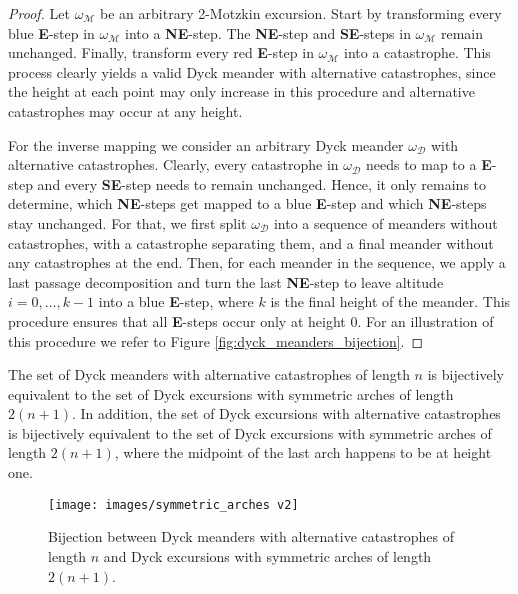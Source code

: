 \begin{proof}
  Let $\omega_\mathcal{M}$ be an arbitrary 2-Motzkin excursion. 
  Start by transforming every blue {\color{lightblue} \textbf{E}}-step in $\omega_\mathcal{M}$ into a \textbf{NE}-step. 
  The \textbf{NE}-step and \textbf{SE}-steps in $\omega_\mathcal{M}$ remain unchanged.
  Finally, transform every red {\color{catred}\textbf{E}}-step in $\omega_\mathcal{M}$ into a catastrophe.
  This process clearly yields a valid Dyck meander with alternative catastrophes, since the height at each point may only increase in this procedure and alternative catastrophes may occur at any height.

  For the inverse mapping we consider an arbitrary Dyck meander $\omega_\mathcal{D}$ with alternative catastrophes. Clearly, every catastrophe in $\omega_\mathcal{D}$ needs to map to a {\color{catred}\textbf{E}}-step and every \textbf{SE}-step needs to remain unchanged.
  Hence, it only remains to determine, which \textbf{NE}-steps get mapped to a blue {\color{lightblue} \textbf{E}}-step and which \textbf{NE}-steps stay unchanged. For that, we first split $\omega_\mathcal{D}$ into a sequence of meanders without catastrophes, with a catastrophe separating them, and a final meander without any catastrophes at the end.
  Then, for each meander in the sequence, we apply a last passage decomposition and turn the last \textbf{NE}-step to leave altitude $i = 0, \dots, k - 1$ into a blue {\color{lightblue} \textbf{E}}-step, where $k$ is the final height of the meander. This procedure ensures that all \textbf{E}-steps occur only at height $0$.
  For an illustration of this procedure we refer to Figure \ref{fig:dyck_meanders_bijection}.
\end{proof}

\begin{theorem}
  \label{thm:dyck_meanders_bijection}
  The set of Dyck meanders with alternative catastrophes of length $n$ is bijectively equivalent to the set of Dyck excursions with symmetric arches of length $2(n+1)$. 
  In addition, the set of Dyck excursions with alternative catastrophes is bijectively equivalent to the set of Dyck excursions with symmetric arches of length $2(n+1)$, where the midpoint of the last arch happens to be at height one.
\end{theorem}

\begin{figure}[hbt!]          
  \centering
  \texttt{[image: images/symmetric\_arches v2]}
  \caption[Bijection involving Dyck meanders with alternative catastrophes.]{Bijection between Dyck meanders with alternative catastrophes of length $n$ and Dyck excursions with symmetric arches of length $2(n+1)$.}
  \label{fig:dyck_meanders_bijection2}
\end{figure}


